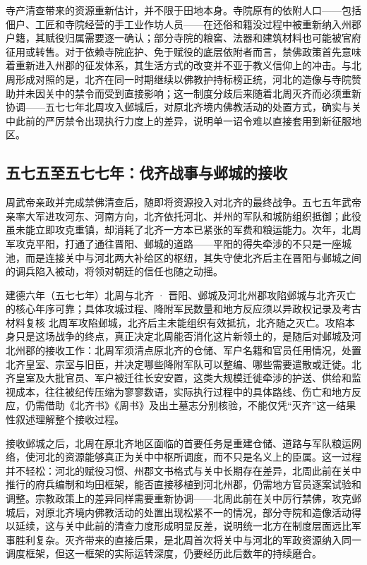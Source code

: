 寺产清查带来的资源重新估计，并不限于田地本身。寺院原有的依附人口——包括佃户、工匠和寺院经营的手工业作坊人员——在还俗和籍没过程中被重新纳入州郡户籍，其赋役归属需要逐一确认；部分寺院的粮窖、法器和建筑材料也可能被官府征用或转售。对于依赖寺院庇护、免于赋役的底层依附者而言，禁佛政策首先意味着重新进入州郡的征发体系，其生活方式的改变并不亚于教义信仰上的冲击。与北周形成对照的是，北齐在同一时期继续以佛教护持标榜正统，河北的造像与寺院赞助并未因关中的禁令而受到直接影响；这一制度分歧后来随着北周灭齐而必须重新协调——五七七年北周攻入邺城后，对原北齐境内佛教活动的处置方式，确实与关中此前的严厉禁令出现执行力度上的差异，说明单一诏令难以直接套用到新征服地区。

\subsection{五七五至五七七年：伐齐战事与邺城的接收}

周武帝亲政并完成禁佛清查后，随即将资源投入对北齐的最终战争。五七五年武帝亲率大军进攻河东、河南方向，北齐依托河北、并州的军队和城防组织抵御；此役虽未能立即攻克重镇，却消耗了北齐一方本已紧张的军费和粮运能力。次年，北周军攻克平阳，打通了通往晋阳、邺城的道路——平阳的得失牵涉的不只是一座城池，而是连接关中与河北两大补给区的枢纽，其失守使北齐后主在晋阳与邺城之间的调兵陷入被动，将领对朝廷的信任也随之动摇。

\begin{event}{}{建德六年（五七七年）}{北周与北齐 · 晋阳、邺城及河北州郡}{攻陷邺城与北齐灭亡的核心年序可靠；具体攻城过程、降附军民数量和地方反应须以异政权记录及考古材料复核}
北周军攻陷邺城，北齐后主未能组织有效抵抗，北齐随之灭亡。攻陷本身只是这场战争的终点，真正决定北周能否消化这片新领土的，是随后对邺城及河北州郡的接收工作：北周军须清点原北齐的仓储、军户名籍和官员任用情况，处置北齐皇室、宗室与旧臣，并决定哪些降附军队可以整编、哪些需要遣散或迁徙。北齐皇室及大批官员、军户被迁往长安安置，这类大规模迁徙牵涉的护送、供给和监视成本，往往被纪传压缩为寥寥数语，实际执行过程中的具体路线、伤亡和地方反应，仍需借助《北齐书》《周书》及出土墓志分别核验，不能仅凭“灭齐”这一结果性叙述理解整个接收过程。
\end{event}

接收邺城之后，北周在原北齐地区面临的首要任务是重建仓储、道路与军队粮运网络，使河北的资源能够真正为关中中枢所调度，而不只是名义上的臣属。这一过程并不轻松：河北的赋役习惯、州郡文书格式与关中长期存在差异，北周此前在关中推行的府兵编制和均田框架，能否直接移植到河北州郡，仍需地方官员逐案试验和调整。宗教政策上的差异同样需要重新协调——北周此前在关中厉行禁佛，攻克邺城后，对原北齐境内佛教活动的处置出现松紧不一的情况，部分寺院和造像活动得以延续，这与关中此前的清查力度形成明显反差，说明统一北方在制度层面远比军事胜利复杂。灭齐带来的直接后果，是北周首次将关中与河北的军政资源纳入同一调度框架，但这一框架的实际运转深度，仍要经历此后数年的持续磨合。

